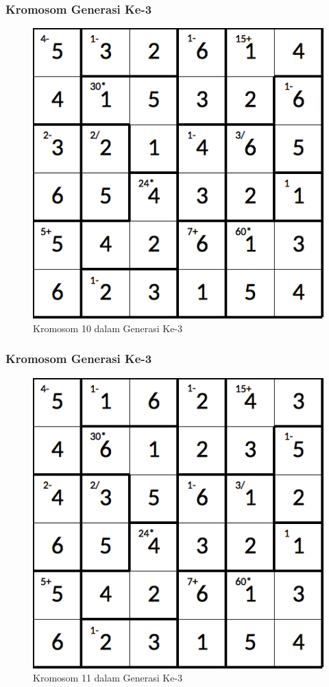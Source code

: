 \documentclass{beamer}
\begin{document}
\begin{frame}
\frametitle{Kromosom Generasi Ke-3}
\begin{figure}
\centering
\captionsetup{justification=centering}
\includegraphics[scale=0.333]{Gambar/hybridgenetic/Generation3Chromosome10}
\caption[Kromosom 10 dalam Generasi Ke-3]{Kromosom 10 dalam Generasi Ke-3}
\label{fig:analisisg3k10}
\end{figure}
\end{frame}

\note{

}

\begin{frame}
\frametitle{Kromosom Generasi Ke-3}
\begin{figure}
\centering
\captionsetup{justification=centering}
\includegraphics[scale=0.333]{Gambar/hybridgenetic/Generation3Chromosome11}
\caption[Kromosom 11 dalam Generasi Ke-3]{Kromosom 11 dalam Generasi Ke-3}
\label{fig:analisisg3k11}
\end{figure}
\end{frame}
\end{document}
